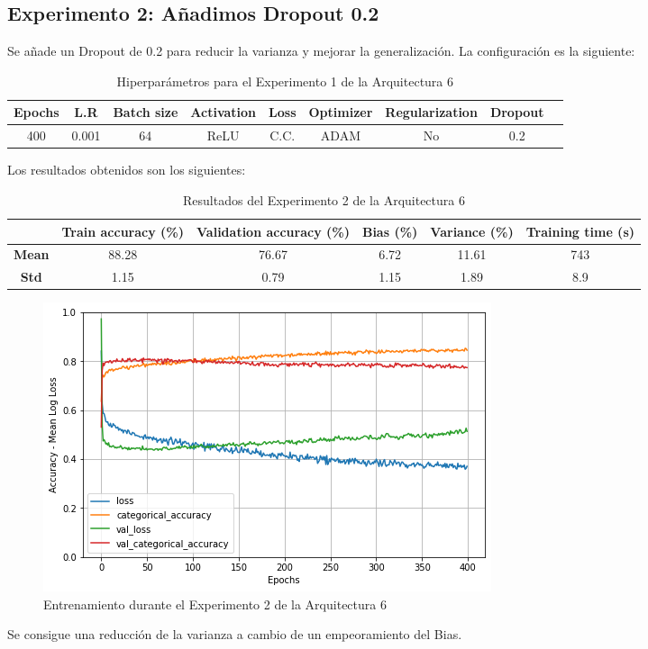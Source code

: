 \documentclass{article}
\begin{document}
        \subsection{Experimento 2: A\~{n}adimos Dropout 0.2}
        \label{s-a6-e2}
            Se a\~{n}ade un Dropout de 0.2 para reducir la varianza y mejorar la generalizaci\'on. La configuraci\'on es la siguiente: 
   
            \begin{table}[!h]
				\begin{tabular}{|c|c|c|c|c|c|c|c|c|}
					\textbf{Epochs}&\textbf{L.R}&\textbf{Batch size}&\textbf{Activation}&\textbf{Loss}&\textbf{Optimizer}&\textbf{Regularization}&\textbf{Dropout}   \\ \hline
					400 & 0.001 & 64 & ReLU & C.C. & ADAM & No & 0.2 
				\end{tabular}
				\caption{Hiperpar\'ametros para el Experimento 1 de la Arquitectura 6}
				\label{tab:hip-a6-e2}
			\end{table}
   
            Los resultados obtenidos son los siguientes: 
            \begin{table}[!h]
				\begin{center}
					\begin{tabular}{ c | c | c | c | c | c |}
						\ & \textbf{Train accuracy (\%)} & \textbf{Validation accuracy (\%)} & \textbf{Bias (\%)} & \textbf{Variance (\%)} & \textbf{Training time (s)} \\ \hline
						\textbf{Mean} & 88.28  & 76.67 & 6.72 & 11.61 & 743  \\ \hline
						\textbf{Std} & 1.15  & 0.79 & 1.15 & 1.89 & 8.9  \\ \hline
					\end{tabular}
					\caption{Resultados del Experimento 2 de la Arquitectura 6}
					\label{tab:res-a2-e5}
				\end{center}
			\end{table}
            \begin{figure}[!h]
				\begin{center}
					\includegraphics[scale=0.5]{b-tr-a6-e2.png}		
					\caption{Entrenamiento durante el Experimento 2 de la Arquitectura 6}	
					\label{tab:tr-a6-e2}
				\end{center}
			\end{figure}
            Se consigue una reducci\'on de la varianza a cambio de un empeoramiento del Bias. 
        
\end{document}
